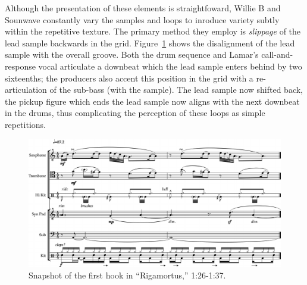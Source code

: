 Although the presentation of these elements is straightfoward, Willie B and Sounwave constantly vary the samples and loops to inroduce variety subtly within the repetitive texture. The primary method they employ is \emph{slippage} of the lead sample backwards in the grid. Figure~\ref{fig:rigamortusslip} shows the disalignment of the lead sample with the overall groove. Both the drum sequence and Lamar's call-and-response vocal articulate a downbeat which the lead sample enters behind by two sixteenths; the producers also accent this position in the grid with a re-articulation of the sub-bass (with the sample). The lead sample now shifted back, the pickup figure which ends the lead sample now aligns with the next downbeat in the drums, thus complicating the perception of these loops as simple repetitions.

\begin{figure}[ht]
    \centering
    \includegraphics[width=\textwidth]{images/figures/chp 02/126137rigamortusslip.pdf}
    \caption{Snapshot of the first hook in ``Rigamortus,'' 1:26-1:37.}
    \label{fig:rigamortusslip}
\end{figure}


